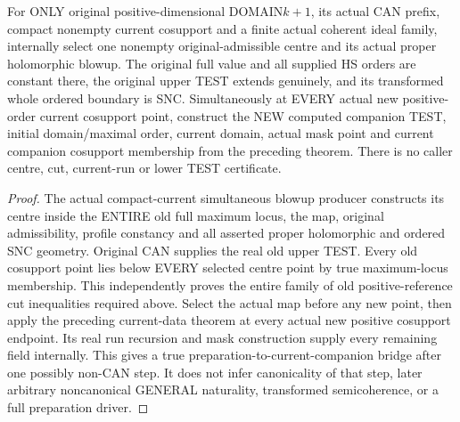 \begin{theorem}
\label{hir:original-compact-simultaneous-current-computed-companion-step}
\leanok
For ONLY original positive-dimensional DOMAIN$k+1$, its actual CAN prefix,
compact nonempty current cosupport and a finite actual coherent ideal
family, internally select one nonempty original-admissible centre and its
actual proper holomorphic blowup. The original full value and all supplied
HS orders are constant there, the original upper TEST extends genuinely,
and its transformed whole ordered boundary is SNC. Simultaneously at EVERY
actual new positive-order current cosupport point, construct the NEW
computed companion TEST, initial domain/maximal order, current domain,
actual mask point and current companion cosupport membership from the
preceding theorem. There is no caller centre, cut, current-run or lower
TEST certificate.
\end{theorem}
\begin{proof}
The actual compact-current simultaneous blowup producer constructs its
centre inside the ENTIRE old full maximum locus, the map, original
admissibility, profile constancy and all asserted proper holomorphic and
ordered SNC geometry. Original CAN supplies the real old upper TEST.
Every old cosupport point lies below EVERY selected centre point by true
maximum-locus membership. This independently proves the entire family of
old positive-reference cut inequalities required above. Select the actual
map before any new point, then apply the preceding current-data theorem at
every actual new positive cosupport endpoint. Its real run recursion and
mask construction supply every remaining field internally. This gives a
true preparation-to-current-companion bridge after one possibly non-CAN
step. It does not infer canonicality of that step, later arbitrary
noncanonical GENERAL naturality, transformed semicoherence, or a full
preparation driver.
\end{proof}
